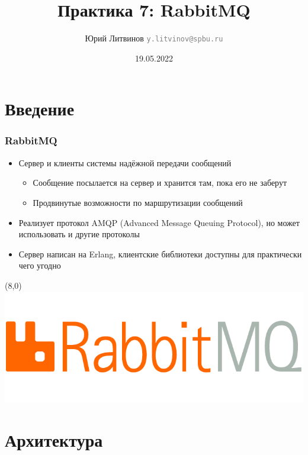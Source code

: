 \documentclass[xetex,mathserif,serif]{beamer}
\title{Практика 7: RabbitMQ}
\author[Юрий Литвинов]{Юрий Литвинов \newline \textcolor{gray}{\small\texttt{y.litvinov@spbu.ru}}}
\date{19.05.2022}
\begin{document}
    \frame{\titlepage}

    \section{Введение}

    \begin{frame}
        \frametitle{RabbitMQ}
        \begin{itemize}
            \item Сервер и клиенты системы надёжной передачи сообщений
            \begin{itemize}
                \item Сообщение посылается на сервер и хранится там, пока его не заберут
                \item Продвинутые возможности по маршрутизации сообщений
            \end{itemize}
            \item Реализует протокол AMQP (Advanced Message Queuing Protocol), но может использовать и другие протоколы
            \item Сервер написан на Erlang, клиентские библиотеки доступны для практически чего угодно
        \end{itemize}
        \begin{textblock}{3}(8,0)
            \includegraphics[width=\textwidth]{rabbitmqLogo.png}
        \end{textblock}
    \end{frame}

    \section{Архитектура}
\end{document}
